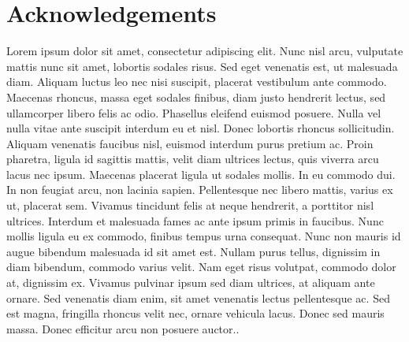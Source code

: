 \chapter*{Acknowledgements}

Lorem ipsum dolor sit amet, consectetur adipiscing elit. Nunc nisl arcu, vulputate mattis nunc sit 
amet, lobortis sodales risus. Sed eget venenatis est, ut malesuada diam. Aliquam luctus leo nec 
nisi suscipit, placerat vestibulum ante commodo. Maecenas rhoncus, massa eget sodales finibus, diam
justo hendrerit lectus, sed ullamcorper libero felis ac odio. Phasellus eleifend euismod posuere.
Nulla vel nulla vitae ante suscipit interdum eu et nisl. Donec lobortis rhoncus sollicitudin. 
Aliquam venenatis faucibus nisl, euismod interdum purus pretium ac. Proin pharetra, ligula id
sagittis mattis, velit diam ultrices lectus, quis viverra arcu lacus nec ipsum. Maecenas placerat
ligula ut sodales mollis. In eu commodo dui. In non feugiat arcu, non lacinia sapien. Pellentesque
nec libero mattis, varius ex ut, placerat sem. Vivamus tincidunt felis at neque hendrerit, a 
porttitor nisl ultrices. Interdum et malesuada fames ac ante ipsum primis in faucibus. Nunc mollis 
ligula eu ex commodo, finibus tempus urna consequat. Nunc non mauris id augue bibendum malesuada 
id sit amet est. Nullam purus tellus, dignissim in diam bibendum, commodo varius velit. Nam eget 
risus volutpat, commodo dolor at, dignissim ex. Vivamus pulvinar ipsum sed diam ultrices, at 
aliquam ante ornare. Sed venenatis diam enim, sit amet venenatis lectus pellentesque ac. Sed est 
magna, fringilla rhoncus velit nec, ornare vehicula lacus. Donec sed mauris massa. Donec efficitur 
arcu non posuere auctor..

\cleardoublepage